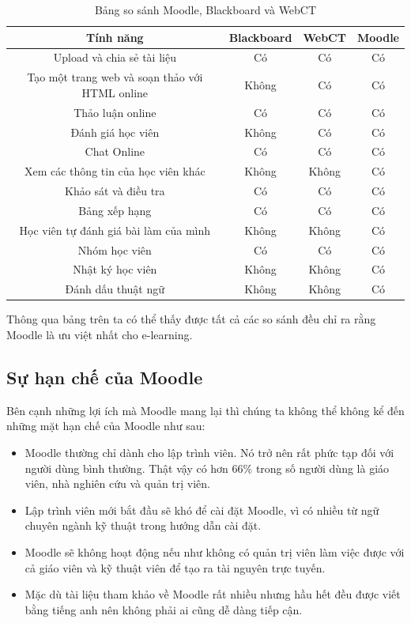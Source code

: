 \begin{itemize}
	\begin{center}
		\begin{table}[!htp]
			\centering
			\begin{tabular}{|c|c|c|c|}
				\hline 
				{\bf Tính năng} & {\bf Blackboard} & {\bf WebCT} & {\bf Moodle} \\ 
				\hline 
				Upload và chia sẻ tài liệu & Có & Có & Có \\ 
				\hline 
				Tạo một trang web và soạn thảo với HTML online & Không & Có & Có \\ 
				\hline 
				Thảo luận online & Có & Có & Có \\ 
				\hline 
				Đánh giá học viên & Không & Có & Có \\ 
				\hline 
				Chat Online & Có & Có & Có \\ 
				\hline 
				Xem các thông tin của học viên khác & Không & Không & Có \\ 
				\hline 
				Khảo sát và điều tra & Có & Có & Có \\ 
				\hline 
				Bảng xếp hạng & Có & Có & Có \\ 
				\hline 
				Học viên tự đánh giá bài làm của mình & Không & Không & Có \\ 
				\hline 
				Nhóm học viên & Có & Có & Có \\ 
				\hline 
				Nhật ký học viên & Không & Không & Có \\ 
				\hline 
				Đánh dấu thuật ngữ & Không & Không & Có \\ 
				\hline 
			\end{tabular} 
			\caption{Bảng so sánh Moodle, Blackboard và WebCT}
			\label{bang2}
		\end{table}
	\end{center}
	Thông qua bảng trên ta có thể thấy được tất cả các so sánh đều chỉ ra rằng Moodle là ưu việt nhất cho e-learning.
\end{itemize}

\subsection{Sự hạn chế của Moodle}
Bên cạnh những lợi ích mà Moodle mang lại thì chúng ta không thể không kể đến những mặt hạn chế của Moodle như sau:

\begin{itemize}
	\item Moodle thường chỉ dành cho lập trình viên. Nó trở nên rất phức tạp đối với người dùng bình thường. Thật vậy có hơn 66\% trong số người dùng là giáo viên, nhà nghiên cứu và quản trị viên. \cite{limitmoodle:1}
	\item Lập trình viên mới bắt đầu sẽ khó để cài đặt Moodle, vì có nhiều từ ngữ chuyên ngành kỹ thuật trong hướng dẫn cài đặt. \cite{limitmoodle:2}
	\item Moodle sẽ không hoạt động nếu như không có quản trị viên làm việc được với cả giáo viên và kỹ thuật viên để tạo ra tài nguyên trực tuyến. \cite{whymoodle}
	\item Mặc dù tài liệu tham khảo về Moodle rất nhiều nhưng hầu hết đều được viết bằng tiếng anh nên không phải ai cũng dễ dàng tiếp cận.
\end{itemize}

